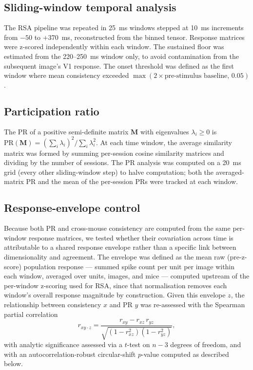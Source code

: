 \documentclass[11pt,onecolumn]{article}
\begin{document}
\subsection{Sliding-window temporal analysis}

The RSA pipeline was repeated in 25~ms windows stepped at 10~ms
increments from $-50$ to $+370$~ms, reconstructed from the binned tensor.
Response matrices were z-scored independently within each window.  The
sustained floor was estimated from the 220--250~ms window only, to avoid
contamination from the subsequent image's V1 response.  The onset
threshold was defined as the first window where mean consistency exceeded
$\max(2 \times \text{pre-stimulus baseline},\, 0.05)$.

\subsection{Participation ratio}

The PR of a positive semi-definite matrix $\mathbf{M}$ with eigenvalues
$\lambda_i \geq 0$ is $\mathrm{PR}(\mathbf{M}) =
(\sum_i \lambda_i)^2 / \sum_i \lambda_i^2$.  At each time window,
the average similarity matrix was formed by summing per-session cosine
similarity matrices and dividing by the number of sessions.  The PR
analysis was computed on a 20~ms grid (every other sliding-window step) to
halve computation; both the averaged-matrix PR and the mean of the
per-session PRs were tracked at each window.

\subsection{Response-envelope control}

Because both PR and cross-mouse consistency are computed from the same
per-window response matrices, we tested whether their covariation across
time is attributable to a shared response envelope rather than a specific
link between dimensionality and agreement.  The envelope was defined as
the mean raw (pre-z-score) population response --- summed spike count per
unit per image within each window, averaged over units, images, and mice
--- computed upstream of the per-window z-scoring used for RSA, since that
normalisation removes each window's overall response magnitude by
construction.  Given this envelope $z$, the relationship between
consistency $x$ and PR $y$ was re-assessed with the Spearman partial
correlation
\begin{equation}
  r_{xy \cdot z} = \frac{r_{xy} - r_{xz} \, r_{yz}}
  {\sqrt{(1 - r_{xz}^2)(1 - r_{yz}^2)}},
  \label{eq:partial}
\end{equation}
with analytic significance assessed via a $t$-test on $n - 3$ degrees of
freedom, and with an autocorrelation-robust circular-shift $p$-value
computed as described below.
\end{document}
